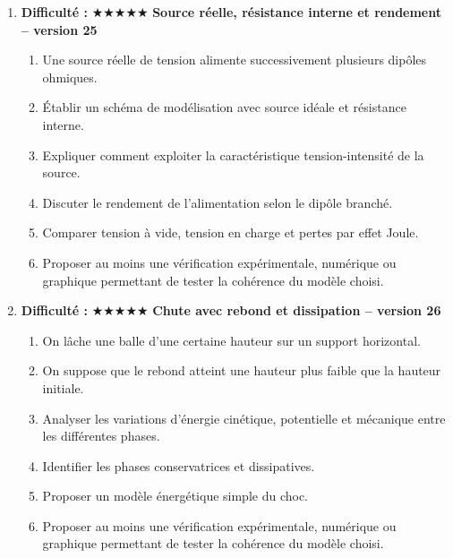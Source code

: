 \documentclass[11pt,a4paper]{article}
\newcommand{\etoiles}[1]{\textbf{Difficulté : }#1}
\begin{document}
\begin{enumerate}[label=\textbf{Problème long \arabic*.},leftmargin=*]
\begin{enumerate}[label=\alph*)]
\item Un tube vertical contient deux liquides non miscibles de masses volumiques différentes.
\item Exprimer la pression à différentes profondeurs.
\item Comparer les contributions de chaque couche.
\item Représenter qualitativement la pression en fonction de l'altitude.
\item Discuter ce qui changerait si l'on remplaçait un liquide par un gaz compressible.
\item Proposer au moins une vérification expérimentale, numérique ou graphique permettant de tester la cohérence du modèle choisi.
\end{enumerate}
\item \etoiles{★★★★★}
\textbf{Source réelle, résistance interne et rendement -- version 25}
\begin{enumerate}[label=\alph*)]
\item Une source réelle de tension alimente successivement plusieurs dipôles ohmiques.
\item Établir un schéma de modélisation avec source idéale et résistance interne.
\item Expliquer comment exploiter la caractéristique tension-intensité de la source.
\item Discuter le rendement de l'alimentation selon le dipôle branché.
\item Comparer tension à vide, tension en charge et pertes par effet Joule.
\item Proposer au moins une vérification expérimentale, numérique ou graphique permettant de tester la cohérence du modèle choisi.
\end{enumerate}
\item \etoiles{★★★★★}
\textbf{Chute avec rebond et dissipation -- version 26}
\begin{enumerate}[label=\alph*)]
\item On lâche une balle d'une certaine hauteur sur un support horizontal.
\item On suppose que le rebond atteint une hauteur plus faible que la hauteur initiale.
\item Analyser les variations d'énergie cinétique, potentielle et mécanique entre les différentes phases.
\item Identifier les phases conservatrices et dissipatives.
\item Proposer un modèle énergétique simple du choc.
\item Proposer au moins une vérification expérimentale, numérique ou graphique permettant de tester la cohérence du modèle choisi.

\end{enumerate}
\end{enumerate}
\end{document}

